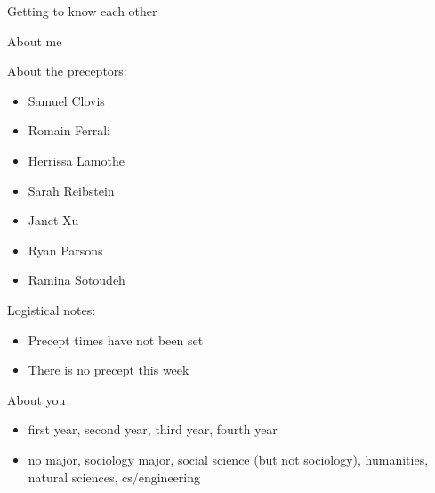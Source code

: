 \documentclass{beamer}
\begin{document}
\begin{frame}

\begin{center}
\Large{Getting to know each other}
\end{center}

\end{frame}
\begin{frame}

\begin{center}
\Large{About me}
\end{center}

\end{frame}
\begin{frame}

About the preceptors:
\pause
\begin{itemize}
\item Samuel Clovis
\item Romain Ferrali
\item Herrissa Lamothe
\item Sarah Reibstein
\item Janet Xu
\end{itemize}
\pause
\begin{itemize}
\item Ryan Parsons
\item Ramina Sotoudeh
\end{itemize}

\end{frame}
\begin{frame}

Logistical notes:
\begin{itemize}
\item Precept times have not been set
\item There is no precept this week
\end{itemize}

\end{frame}
\begin{frame}

\begin{center}
\Large{About you}
\end{center}

\end{frame}
\begin{frame}

\begin{itemize}
\item first year, second year, third year, fourth year
\pause
\item no major, sociology major, social science (but not sociology), humanities, natural sciences, cs/engineering
\end{itemize}

\end{frame}
\end{document}
